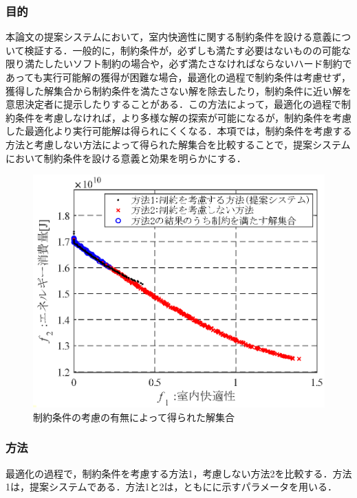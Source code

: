 \subsubsection{目的}
本論文の提案システムにおいて，室内快適性に関する制約条件を設ける意義について検証する．一般的に，制約条件が，必ずしも満たす必要はないものの可能な限り満たしたいソフト制約の場合や，必ず満たさなければならないハード制約であっても実行可能解の獲得が困難な場合，最適化の過程で制約条件は考慮せず，獲得した解集合から制約条件を満たさない解を除去したり，制約条件に近い解を意思決定者に提示したりすることがある．この方法によって，最適化の過程で制約条件を考慮しなければ，より多様な解の探索が可能になるが，制約条件を考慮した最適化より実行可能解は得られにくくなる．本項では，制約条件を考慮する方法と考慮しない方法によって得られた解集合を比較することで，提案システムにおいて制約条件を設ける意義と効果を明らかにする．

\begin{figure}[htbp]
  \begin{center}
    \includegraphics[width=0.7\linewidth]{fig/sim_result_pareto_cc.eps}
  \end{center}
  \caption{制約条件の考慮の有無によって得られた解集合}
  \label{fig::sim_result_pareto_cc}
\end{figure}

\subsubsection{方法}
最適化の過程で，制約条件を考慮する方法1，考慮しない方法2を比較する．方法1は，提案システムである．方法1と2は，ともにに示すパラメータを用いる．


